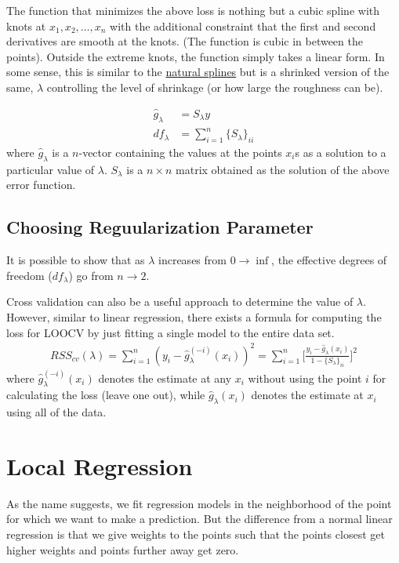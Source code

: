 \documentclass[../statistical_learning_notes.tex]{subfiles}
\begin{document}
    The function that minimizes the above loss is nothing but a cubic spline with knots at $x_{1}, x_{2}, \ldots, x_{n}$ with the additional constraint that the first and second derivatives are smooth at the knots. (The function is cubic in between the points). Outside the extreme knots, the function simply takes a linear form.\newline
    In some sense, this is similar to the \hyperlink{naturalsplines}{natural splines} but is a shrinked version of the same, $\lambda$ controlling the level of shrinkage (or how large the roughness can be).

    \begin{align*}
        \hat{g}_{\lambda} &= S_{\lambda}y\\
        df_{\lambda} &= \sum_{i=1}^{n} \{S_{\lambda}\}_{ii}
    \end{align*}
    where $\hat{g}_{\lambda}$ is a $n$-vector containing the values at the points $x_{i}$s as a solution to  a particular value of $\lambda$. $S_{\lambda}$ is a $n\times n$ matrix obtained as the solution of the above error function.

    
    \subsection{Choosing Reguularization Parameter}
    It is possible to show that as $\lambda$ increases from $0 \to \inf$, the effective degrees of freedom ($df_{\lambda}$) go from $n \to 2$.\newline

    Cross validation can also be a useful approach  to determine the value of $\lambda$. However, similar to linear regression, there exists a formula for computing the loss for LOOCV by just fitting a single model to the entire data set.
    \begin{align*}
        RSS_{cv}(\lambda) = \sum_{i=1}^{n} (y_{i} - \hat{g}_{\lambda}^{(-i)}(x_{i}))^{2} = \sum_{i=1}^{n} \bigg[ \frac{y_{i} - \hat{g}_{\lambda}(x_{i})}{1 - \{S_{\lambda}\}_{ii}} \bigg]^{2}
    \end{align*}
    where $\hat{g}_{\lambda}^{(-i)}(x_{i})$ denotes the estimate at any $x_{i}$ without using the point $i$ for calculating the loss (leave one out), while $\hat{g}_{\lambda}(x_{i})$ denotes the estimate at $x_{i}$ using all of the data.


    \section{Local Regression}
    As the name suggests, we fit regression models in the neighborhood of the point for which we want to make a prediction. But the difference from a normal linear regression is that we give weights to the points such that the points closest get higher weights and points further away get zero.\newline
\end{document}

